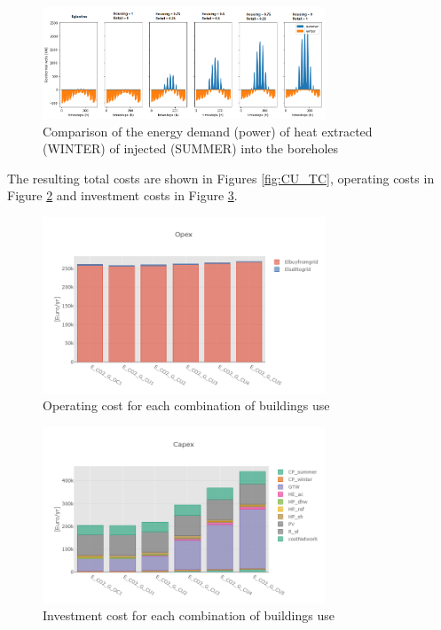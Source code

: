 \documentclass{article}
\begin{document}
\begin{figure}[htp]
	\centering
	\includegraphics[width=0.75\textwidth]{CU_gtw.png}
	\caption{Comparison of the energy demand (power) of heat extracted (WINTER) of injected (SUMMER) into the boreholes}
	\label{fig:CU_gtw}
\end{figure}

The resulting total costs are shown in Figures \ref{fig:CU_TC}, operating costs in Figure \ref{fig:CU_OC} and investment costs in Figure \ref{fig:CU_IC}.

\begin{figure}[htp]
	\centering
	\includegraphics[width=0.75\textwidth]{CU_OC.png}
	\caption{Operating  cost for each combination of buildings use}
	\label{fig:CU_OC}
\end{figure}
\begin{figure}[htp]
	\centering
	\includegraphics[width=0.75\textwidth]{CU_IC.png}
	\caption{Investment cost for each combination of buildings use}
	\label{fig:CU_IC}
\end{figure}
\end{document}
